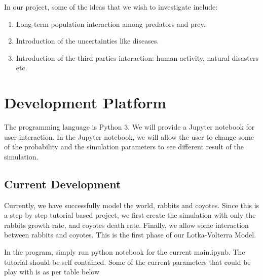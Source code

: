 \documentclass{article}
\begin{document}
\begin{normalsize}
		In our project, some of the ideas that we wish to investigate include:
		\begin{enumerate}
			\item Long-term population interaction among predators and prey.
			\item Introduction of the uncertainties like diseases.
			\item Introduction of the third parties interaction: human activity, natural disasters etc.
		\end{enumerate}
		
		\section{Development Platform}
		The programming language is Python 3. We will provide a Jupyter notebook for user interaction.
		In the Jupyter notebook, we will allow the user to change some of the probability and the simulation parameters to see different result of the simulation.
		
		\subsection{Current Development}
		Currently, we have successfully model the world, rabbits and coyotes. Since this is a step by step tutorial based project, we first create the simulation with only the rabbits growth rate, and coyotes death rate. Finally, we allow some interaction between rabbits and coyotes. This is the first phase of our Lotka-Volterra Model.
		
		In the program, simply run python notebook for the current main.ipynb. The tutorial should be self contained. Some of the current parameters that could be play with is as per table below
		

\end{normalsize}
\end{document}
